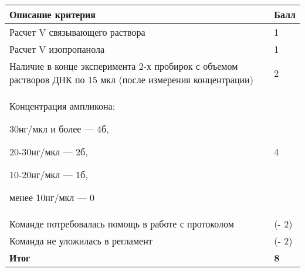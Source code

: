 \markSection

\begin{tabular}{|p{11cm}|p{3cm}|}
    \hline
    \textbf{Описание критерия} & \textbf{Балл} \\
    \hline
    \hline
    Расчет V связывающего раствора & 1 \\
    \hline
    Расчет V изопропанола & 1 \\
    \hline
    Наличие в конце эксперимента 2-х пробирок с объемом растворов ДНК по 15 мкл (после измерения концентрации) & 2 \\
    \hline
    Концентрация ампликона: 
    
    30нг/мкл и более — 4б, 
    
    20-30нг/мкл — 2б, 
    
    10-20нг/мкл — 1б, 
    
    менее 10нг/мкл — 0 & 4 \\
    \hline
    Команде потребовалась помощь в работе с протоколом & (- 2) \\
    \hline
    Команда не уложилась в регламент & (- 2) \\
    \hline
    \hline
    \textbf{Итог} & \textbf{8} \\
    \hline
\end{tabular}